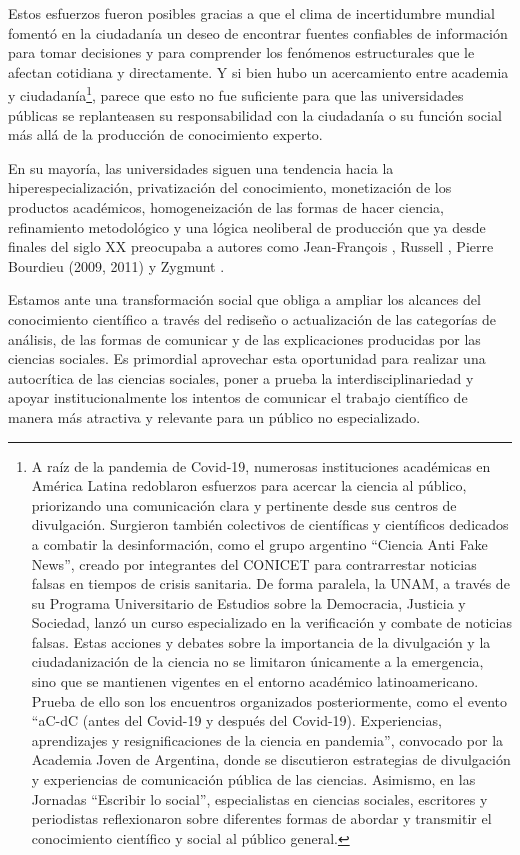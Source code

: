 \documentclass[
  spanish,
  11pt,
  a4paper,
]{scrbook}
\begin{document}
Estos esfuerzos fueron posibles gracias a que el clima de incertidumbre
mundial fomentó en la ciudadanía un deseo de encontrar fuentes
confiables de información para tomar decisiones y para comprender los
fenómenos estructurales que le afectan cotidiana y directamente. Y si
bien hubo un acercamiento entre academia y ciudadanía\footnote{A raíz de
  la pandemia de Covid-19, numerosas instituciones académicas en América
  Latina redoblaron esfuerzos para acercar la ciencia al público,
  priorizando una comunicación clara y pertinente desde sus centros de
  divulgación. Surgieron también colectivos de científicas y científicos
  dedicados a combatir la desinformación, como el grupo argentino
  ``Ciencia Anti Fake News'', creado por integrantes del CONICET para
  contrarrestar noticias falsas en tiempos de crisis sanitaria. De forma
  paralela, la UNAM, a través de su Programa Universitario de Estudios
  sobre la Democracia, Justicia y Sociedad, lanzó un curso especializado
  en la verificación y combate de noticias falsas. Estas acciones y
  debates sobre la importancia de la divulgación y la ciudadanización de
  la ciencia no se limitaron únicamente a la emergencia, sino que se
  mantienen vigentes en el entorno académico latinoamericano. Prueba de
  ello son los encuentros organizados posteriormente, como el evento
  ``aC-dC (antes del Covid-19 y después del Covid-19). Experiencias,
  aprendizajes y resignificaciones de la ciencia en pandemia'',
  convocado por la Academia Joven de Argentina, donde se discutieron
  estrategias de divulgación y experiencias de comunicación pública de
  las ciencias. Asimismo, en las Jornadas ``Escribir lo social'',
  especialistas en ciencias sociales, escritores y periodistas
  reflexionaron sobre diferentes formas de abordar y transmitir el
  conocimiento científico y social al público general.}, parece que esto
no fue suficiente para que las universidades públicas se replanteasen su
responsabilidad con la ciudadanía o su función social más allá de la
producción de conocimiento experto.

En su mayoría, las universidades siguen una tendencia hacia la
hiperespecialización, privatización del conocimiento, monetización de
los productos académicos, homogeneización de las formas de hacer
ciencia, refinamiento metodológico y una lógica neoliberal de producción
que ya desde finales del siglo XX preocupaba a autores como
Jean-François \textcite{Lyotard2019}, Russell \textcite{Jacoby2000},
Pierre Bourdieu (2009, 2011) y Zygmunt \textcite{Bauman1997}.

Estamos ante una transformación social que obliga a ampliar los alcances
del conocimiento científico a través del rediseño o actualización de las
categorías de análisis, de las formas de comunicar y de las
explicaciones producidas por las ciencias sociales. Es primordial
aprovechar esta oportunidad para realizar una autocrítica de las
ciencias sociales, poner a prueba la interdisciplinariedad y apoyar
institucionalmente los intentos de comunicar el trabajo científico de
manera más atractiva y relevante para un público no especializado.
\end{document}
